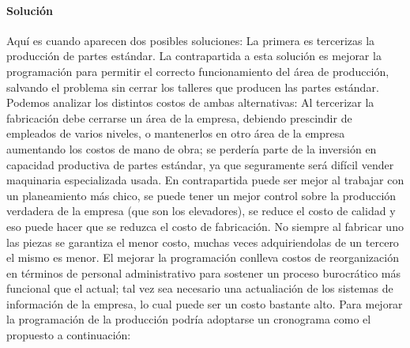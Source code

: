 \paragraph{Soluci\'on}
Aqu\'i es cuando aparecen dos posibles soluciones: La primera es tercerizas la producci\'on de partes est\'andar. La contrapartida a esta soluci\'on es mejorar la programaci\'on para permitir el correcto funcionamiento del \'area de producci\'on, salvando el problema sin cerrar los talleres que producen las partes est\'andar. 
Podemos analizar los distintos costos de ambas alternativas:
Al tercerizar la fabricaci\'on debe cerrarse un \'area de la empresa, debiendo prescindir de empleados de varios niveles, o mantenerlos en otro \'area de la empresa aumentando los costos de mano de obra; se perder\'ia parte de la inversi\'on en capacidad productiva de partes est\'andar, ya que seguramente ser\'a dif\'icil vender maquinaria especializada usada. En contrapartida puede ser mejor al trabajar con un planeamiento m\'as chico, se puede tener un mejor control sobre la producci\'on verdadera de la empresa (que son los elevadores), se reduce el costo de calidad y eso puede hacer que se reduzca el costo de fabricaci\'on. No siempre al fabricar uno las piezas se garantiza el menor costo, muchas veces adquiriendolas de un tercero el mismo es menor.
El mejorar la programaci\'on conlleva costos de reorganizaci\'on en t\'erminos de personal administrativo para sostener un proceso burocr\'atico m\'as funcional que el actual; tal vez sea necesario una actualiaci\'on de los sistemas de informaci\'on de la empresa, lo cual puede ser un costo bastante alto.
Para mejorar la programaci\'on de la producci\'on podr\'ia adoptarse un cronograma como el propuesto a continuaci\'on:
